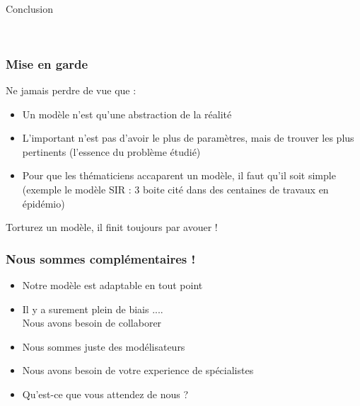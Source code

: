 \documentclass[a4paper]{cours-bdd}
\begin{document}


\begin{frame}
  \hfill \
  \begin{center}
    \Huge
    Conclusion
  \end{center}
  \hfill \

\end{frame}


\begin{frame}[fragile]
  \frametitle{Mise en garde}

  Ne jamais perdre de vue que  :
  \begin{itemize}
  \item Un modèle n'est qu'une abstraction de la réalité
  \item L'important n'est pas d'avoir le plus de paramètres, mais de trouver les plus pertinents (l'essence du problème étudié)
  \item Pour que les thématiciens accaparent un modèle, il faut qu'il soit simple (exemple le modèle SIR : 3 boite cité dans des centaines de travaux en épidémio)
  \end{itemize}

  \bigskip
  
  \begin{block}{}
    \begin{center}
  Torturez un modèle, il finit toujours par avouer !
\end{center}
\end{block}

\end{frame}


\begin{frame}[fragile]
  \frametitle{Nous sommes complémentaires !}

  \begin{itemize}
  \item Notre modèle est adaptable en tout point
  \item Il y a surement plein de biais .... \\ Nous avons besoin de
    collaborer
  \end{itemize}

  \bigskip

  
  \begin{itemize}
    \item Nous sommes juste des modélisateurs
    \item Nous avons besoin de votre experience de spécialistes
    \item Qu'est-ce que vous attendez de nous ?
    \end{itemize}

  
\end{frame}
\end{document}
